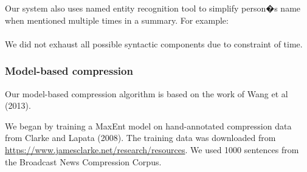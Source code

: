 \documentclass[11pt]{article}
\begin{document}
Our system also uses named entity recognition tool to simplify person�s name when mentioned multiple times in a summary. For example: 
\\

\\

We did not exhaust all possible syntactic components due to constraint of time.

\subsubsection{Model-based compression}

Our model-based compression algorithm is based on the work of Wang et al (2013).

We began by training a MaxEnt model on hand-annotated compression data from Clarke and Lapata (2008). The training data was downloaded from \url{https://www.jamesclarke.net/research/resources}. We used 1000 sentences from the Broadcast News Compression Corpus.
\end{document}
